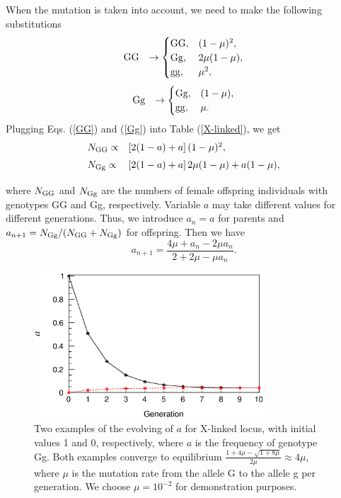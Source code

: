 \documentclass[referee,sn-basic]{sn-jnl}%
\theoremstyle{thmstyleone}%
\theoremstyle{thmstyletwo}%
\theoremstyle{thmstylethree}%
\begin{document}
When the mutation is taken into account, we need to make the following substitutions
\begin{equation}\label{GG}
  \begin{array}{lllll}
  {\rm GG}& \to 
  \begin{cases}
    {\rm GG}, &(1-\mu)^2,\\ {\rm Gg}, &2\mu(1-\mu),\\{\rm gg}, &\mu^2, 
  \end{cases}
  \end{array}
\end{equation}
\begin{equation}\label{Gg}
  \begin{array}{lllll}
  {\rm Gg}& \to 
  \begin{cases}
   {\rm Gg}, &(1-\mu),\\ {\rm gg}, &\mu.
  \end{cases}
  \end{array}
\end{equation}
Plugging Eqs. (\ref{GG}) and (\ref{Gg}) into Table (\ref{X-linked}),
we get
\begin{equation}
 \begin{array}{lll}
\vspace{2mm} N_{\rm GG}\propto&\left[2(1-a)+a\right](1-\mu)^2,\\
\vspace{2mm} N_{\rm Gg}\propto&\left[2(1-a)+a\right]2\mu(1-\mu)+ a(1-\mu),
  \end{array}
  \vspace{3mm}
\end{equation}
where $N_{\rm GG}$ and $N_{\rm Gg}$ are the numbers of female offspring individuals with genotypes GG and Gg, respectively. Variable $a$ may take different values for different generations. Thus, we introduce $a_n=a$ for parents and $a_{n+1}=N_{\rm Gg}/(N_{\rm GG}+N_{\rm Gg})$ for offspring. Then we have
\begin{equation}
a_{n+1}=\frac{4 \mu + a_n - 2 \mu a_n }{2 + 2 \mu - \mu a_n  }.
\end{equation}

\begin{figure}
      \includegraphics[width=8.6cm]{Fig1.eps}
      \caption{
Two examples of the evolving of $a$ for X-linked locus, with initial values 1 and 0, respectively, where $a$ is the frequency of genotype Gg. Both examples converge to equilibrium $\frac{1+4\mu-\sqrt{1+8\mu}}{2\mu}\approx 4\mu$, where $\mu$ is the mutation rate from the allele G to the allele g per generation. We choose $\mu=10^{-2}$ for demonstration purposes.
}\label{X_linked}
\end{figure}
\end{document}
